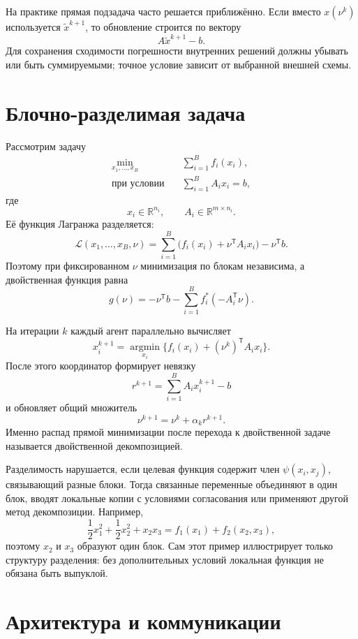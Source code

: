 На практике прямая подзадача часто решается приближённо. Если вместо
\(x(\nu^k)\) используется \(\widetilde x^{k+1}\), то обновление
строится по вектору
\[
    A\widetilde x^{k+1}-b.
\]
Для сохранения сходимости погрешности внутренних решений должны
убывать или быть суммируемыми; точное условие зависит от выбранной
внешней схемы.

\section{Блочно-разделимая задача}

Рассмотрим задачу
\[
\begin{aligned}
    \min_{x_1,\ldots,x_B}\quad
    &\sum_{i=1}^{B}f_i(x_i),
    \\
    \text{при условии}\quad
    &\sum_{i=1}^{B}A_ix_i=b,
\end{aligned}
\]
где
\[
    x_i\in\mathbb R^{n_i},
    \qquad
    A_i\in\mathbb R^{m\times n_i}.
\]
Её функция Лагранжа разделяется:
\[
    \mathcal L(x_1,\ldots,x_B,\nu)
    =
    \sum_{i=1}^{B}
    \bigl(f_i(x_i)+\nu^{\mathsf T}A_ix_i\bigr)
    -\nu^{\mathsf T}b.
\]
Поэтому при фиксированном \(\nu\) минимизация по блокам независима,
а двойственная функция равна
\[
    g(\nu)
    =
    -\nu^{\mathsf T}b
    -
    \sum_{i=1}^{B}f_i^*(-A_i^{\mathsf T}\nu).
\]

На итерации \(k\) каждый агент параллельно вычисляет
\[
    x_i^{k+1}
    =
    \operatorname*{argmin}_{x_i}
    \bigl\{f_i(x_i)+(\nu^k)^{\mathsf T}A_ix_i\bigr\}.
\]
После этого координатор формирует невязку
\[
    r^{k+1}
    =
    \sum_{i=1}^{B}A_ix_i^{k+1}-b
\]
и обновляет общий множитель
\[
    \nu^{k+1}
    =
    \nu^k+\alpha_k r^{k+1}.
\]
Именно распад прямой минимизации после перехода к двойственной задаче
называется двойственной декомпозицией.

Разделимость нарушается, если целевая функция содержит член
\(\psi(x_i,x_j)\), связывающий разные блоки. Тогда связанные
переменные объединяют в один блок, вводят локальные копии с условиями
согласования или применяют другой метод декомпозиции. Например,
\[
    \frac12x_1^2+\frac12x_2^2+x_2x_3
    =
    f_1(x_1)+f_2(x_2,x_3),
\]
поэтому \(x_2\) и \(x_3\) образуют один блок. Сам этот пример
иллюстрирует только структуру разделения: без дополнительных условий
локальная функция не обязана быть выпуклой.

\section{Архитектура и коммуникации}

